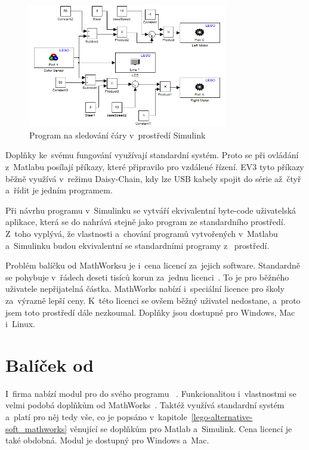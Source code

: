 \begin{figure}[h]
	\centering
	\includegraphics[width=330px]{images/mathworks-simulink_line-tracking-model.png}
	\caption[Program na sledování čáry v~prostředí Simulink]{Program na sledování čáry v~prostředí Simulink\protect\footnotemark}
	\label{fig:mathworks-simulink_line-tracking-model}
\end{figure}


Doplňky ke~svému fungování využívají standardní \lego{} systém. 
Proto se při ovládání  z~Matlabu posílají příkazy, které \lego{} připravilo pro vzdálené řízení. 
EV3 tyto příkazy běžně využívá v~režimu Daisy-Chain, kdy lze USB kabely spojit do série až~čtyř  a~řídit je jedním programem.     

Při návrhu programu v~Simulinku se vytváří ekvivalentní byte-code uživatelská aplikace, která se do  nahrává stejně jako program ze standardního \lego{} prostředí. 
Z~toho vyplývá, že vlastnosti a~chování programů vytvořených v~Matlabu a~Simulinku budou ekvivalentní se standardními programy z~\lego{} prostředí.

Problém balíčku od MathWorksu je i~cena licencí za~jejich software. 
Standardně se pohybuje v~řádech deseti tisíců korun za~jednu licenci~\cite{legoProgramingPlatform_MathWork_Humusoft-price}.
To je pro běžného uživatele nepřijatelná částka. 
MathWorks nabízí i~speciální licence pro školy za~výrazně lepší ceny. 
K~této licenci se ovšem běžný uživatel nedostane, a~proto jsem toto prostředí dále nezkoumal.
Doplňky jsou dostupné pro Windows, Mac i~Linux. 
 

\section{Balíček od \NI}

I~firma \NI{} nabízí modul pro \legoM{} do svého programu \labview{}~\cite{legoProgramingPlatform_NI_LabVIEW}. 
Funkcionalitou i~vlastnostmi se velmi podobá doplňkům od MathWorks~\cite{garber2015learning}.
Taktéž využívá standardní \lego{} systém a~platí pro něj tedy vše, co je popsáno v~kapitole~\ref{lego-alternative-soft_mathworks} věnující se doplňkům pro Matlab a~Simulink. 
Cena licencí je také obdobná. Modul je dostupný pro Windows a~Mac. 


